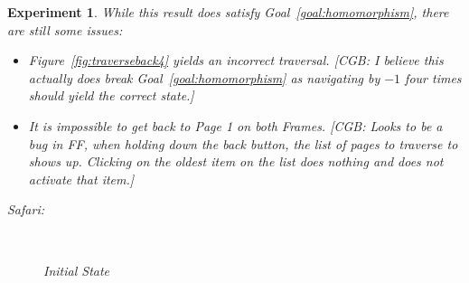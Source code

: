 \documentclass{notes}
\newtheorem{experiment}{Experiment}
\begin{document}
\begin{experiment}
  While this result does satisfy Goal~\ref{goal:homomorphism}, there are still some issues:
  \begin{itemize}
    \item Figure~\ref{fig:traverseback4} yields an incorrect traversal. [CGB: I believe this actually does break Goal~\ref{goal:homomorphism} as navigating by $-1$ four times should yield the correct state.]
    \item It is impossible to get back to Page 1 on both Frames. [CGB: Looks to be a bug in FF, when holding down the back button, the list of pages to traverse to shows up. Clicking on the oldest item on the list does nothing and does not activate that item.]
  \end{itemize}

  Safari:
  \begin{figure}[H]
    ~
    \caption{Initial State}
  \end{figure}


\end{experiment}
\end{document}
